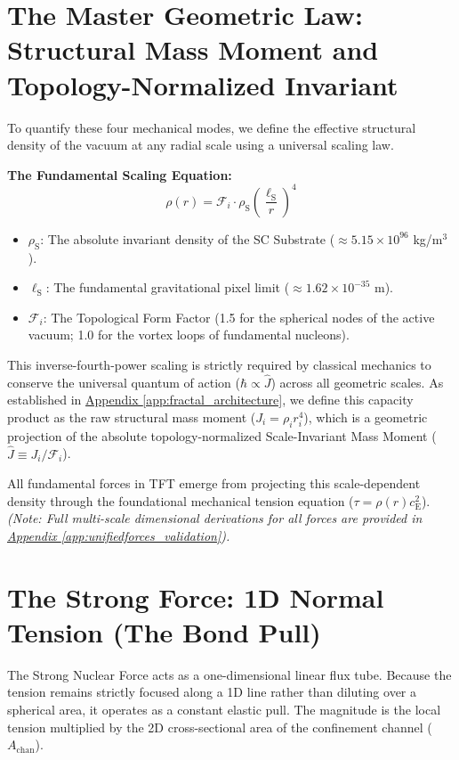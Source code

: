 \section{The Master Geometric Law: Structural Mass Moment and Topology-Normalized Invariant}
To quantify these four mechanical modes, we define the effective structural density of the vacuum at any radial scale using a universal scaling law.

\vspace{0.5em}
\noindent\textbf{The Fundamental Scaling Equation:}
\begin{equation}
    \rho(r) = \mathcal{F}_i \cdot \rho_{\mathrm{S}} \left(\frac{\ell_{\mathrm{S}}}{r}\right)^4
\end{equation}
\begin{itemize}
    \item $\rho_{\mathrm{S}}$: The absolute invariant density of the SC Substrate ($\approx 5.15 \times 10^{96}$ kg/m$^3$).
    \item $\ell_{\mathrm{S}}$: The fundamental gravitational pixel limit ($\approx 1.62 \times 10^{-35}$ m).
    \item $\mathcal{F}_i$: The Topological Form Factor (1.5 for the spherical nodes of the active vacuum; 1.0 for the vortex loops of fundamental nucleons).
\end{itemize}

This inverse-fourth-power scaling is strictly required by classical mechanics to conserve the universal quantum of action ($\hbar \propto \hat{J}$) across all geometric scales. As established in \hyperref[app:fractal_architecture]{Appendix \ref*{app:fractal_architecture}}, we define this capacity product as the raw structural mass moment ($J_i = \rho_i r_i^4$), which is a geometric projection of the absolute topology-normalized Scale-Invariant Mass Moment ($\hat{J} \equiv J_i / \mathcal{F}_i$).

All fundamental forces in TFT emerge from projecting this scale-dependent density through the foundational mechanical tension equation ($\tau = \rho(r) c_{\mathrm{E}}^2$). \textit{(Note: Full multi-scale dimensional derivations for all forces are provided in \hyperref[app:unifiedforces_validation]{Appendix \ref*{app:unifiedforces_validation}}).}

\section{The Strong Force: 1D Normal Tension (The Bond Pull)}
The Strong Nuclear Force acts as a one-dimensional linear flux tube. Because the tension remains strictly focused along a 1D line rather than diluting over a spherical area, it operates as a constant elastic pull. The magnitude is the local tension multiplied by the 2D cross-sectional area of the confinement channel ($A_{\mathrm{chan}}$).


